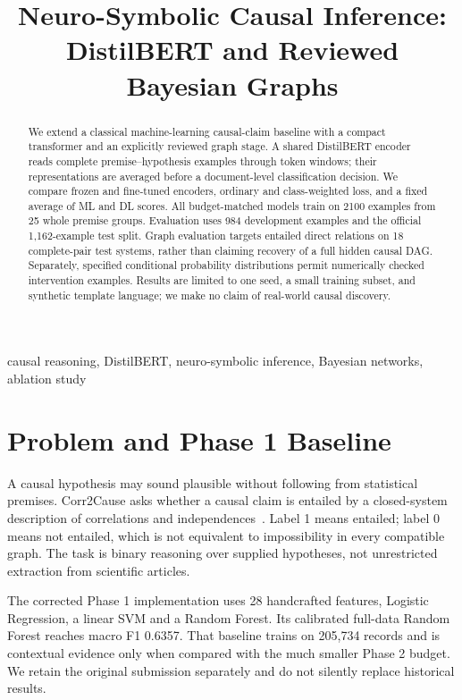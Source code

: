 \documentclass[conference]{IEEEtran}
\title{Neuro-Symbolic Causal Inference:\\DistilBERT and Reviewed Bayesian Graphs}
\author{\IEEEauthorblockN{Aman, Ansh Tomar, Ravleen Singh, Ritik, and Sarabjeet Singh}
\IEEEauthorblockA{CSAI Advanced Machine Learning and Deep Learning Project\\Phase 2: Local Compute-Budget Evaluation}}
\begin{document}
\maketitle
\begin{abstract}
We extend a classical machine-learning causal-claim baseline with a compact transformer and an explicitly reviewed graph stage. A shared DistilBERT encoder reads complete premise--hypothesis examples through token windows; their representations are averaged before a document-level classification decision. We compare frozen and fine-tuned encoders, ordinary and class-weighted loss, and a fixed average of ML and DL scores. All budget-matched models train on 2100 examples from 25 whole premise groups. Evaluation uses 984 development examples and the official 1,162-example test split. Graph evaluation targets entailed direct relations on 18 complete-pair test systems, rather than claiming recovery of a full hidden causal DAG. Separately, specified conditional probability distributions permit numerically checked intervention examples. Results are limited to one seed, a small training subset, and synthetic template language; we make no claim of real-world causal discovery.
\end{abstract}
\begin{IEEEkeywords}
causal reasoning, DistilBERT, neuro-symbolic inference, Bayesian networks, ablation study
\end{IEEEkeywords}

\section{Problem and Phase 1 Baseline}
A causal hypothesis may sound plausible without following from statistical premises. Corr2Cause asks whether a causal claim is entailed by a closed-system description of correlations and independences~\cite{corr}. Label 1 means entailed; label 0 means not entailed, which is not equivalent to impossibility in every compatible graph. The task is binary reasoning over supplied hypotheses, not unrestricted extraction from scientific articles.

The corrected Phase 1 implementation uses 28 handcrafted features, Logistic Regression, a linear SVM and a Random Forest. Its calibrated full-data Random Forest reaches macro F1 0.6357. That baseline trains on 205,734 records and is contextual evidence only when compared with the much smaller Phase 2 budget. We retain the original submission separately and do not silently replace historical results.
\end{document}
